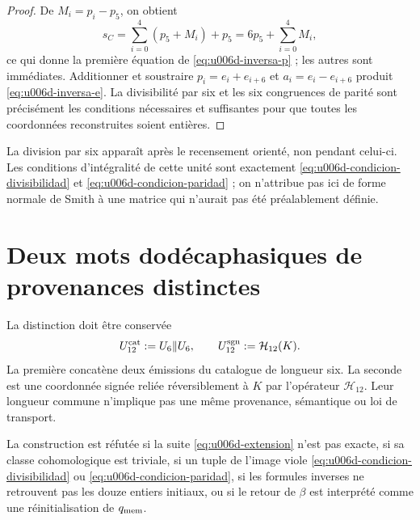 \begin{proof}
De \(M_i=p_i-p_5\), on obtient
\[
 s_C=\sum_{i=0}^{4}(p_5+M_i)+p_5
 =6p_5+\sum_{i=0}^{4}M_i,
\]
ce qui donne la première équation de \eqref{eq:u006d-inversa-p} ; les autres sont
immédiates. Additionner et soustraire
\(p_i=e_i+e_{i+6}\) et \(a_i=e_i-e_{i+6}\) produit
\eqref{eq:u006d-inversa-e}. La divisibilité par six et les six
congruences de parité sont précisément les conditions nécessaires et
suffisantes pour que toutes les coordonnées reconstruites soient entières.
\end{proof}

La division par six apparaît après le recensement orienté, non pendant celui-ci. Les
conditions d’intégralité de cette unité sont exactement
\eqref{eq:u006d-condicion-divisibilidad} et
\eqref{eq:u006d-condicion-paridad} ; on n’attribue pas ici de forme normale de
Smith à une matrice qui n’aurait pas été préalablement définie.

\section{Deux mots dodécaphasiques de provenances distinctes}

La distinction doit être conservée
\begin{equation}
 U_{12}^{\rm cat}:=U_6\Vert U_6,
 \qquad
 U_{12}^{\rm sgn}:=\mathcal H_{12}(K).
 \label{eq:u006d-dos-palabras-doce}
\end{equation}
La première concatène deux émissions du catalogue de longueur six. La seconde
est une coordonnée signée reliée réversiblement à \(K\) par l’opérateur
\(\mathcal H_{12}\). Leur longueur commune n’implique pas une même provenance,
sémantique ou loi de transport.

\begin{criterion}
\label{crit:u006d-refutacion}
La construction est réfutée si la suite
\eqref{eq:u006d-extension} n’est pas exacte, si sa classe cohomologique est
triviale, si un tuple de l’image viole
\eqref{eq:u006d-condicion-divisibilidad} ou
\eqref{eq:u006d-condicion-paridad}, si les formules inverses ne retrouvent pas
les douze entiers initiaux, ou si le retour de \(\beta\) est interprété comme
une réinitialisation de \(q_{\rm mem}\).
\end{criterion}
